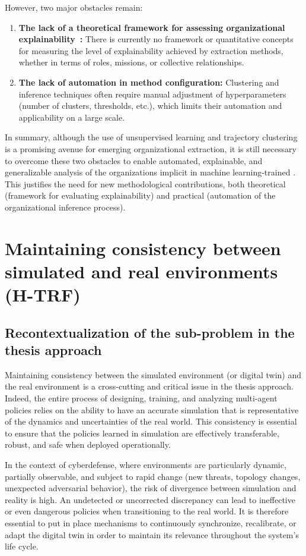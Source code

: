 However, two major obstacles remain:
\begin{enumerate}
\item \textbf{The lack of a theoretical framework for assessing organizational explainability~:} There is currently no framework or quantitative concepts for measuring the level of explainability achieved by extraction methods, whether in terms of roles, missions, or collective relationships.
\item \textbf {The lack of automation in method configuration:} Clustering and inference techniques often require manual adjustment of hyperparameters (number of clusters, thresholds, etc.), which limits their automation and applicability on a large scale.
\end {enumerate}

In summary, although the use of unsupervised learning and trajectory clustering is a promising avenue for emerging organizational extraction, it is still necessary to overcome these two obstacles to enable automated, explainable, and generalizable analysis of the organizations implicit in machine learning-trained . This justifies the need for new methodological contributions, both theoretical (framework for evaluating explainability) and practical (automation of the organizational inference process).



\section{Maintaining consistency between simulated and real environments (H-TRF)}

\subsection*{Recontextualization of the sub-problem in the thesis approach}

Maintaining consistency between the simulated environment (or digital twin) and the real environment is a cross-cutting and critical issue in the thesis approach. Indeed, the entire process of designing, training, and analyzing multi-agent policies relies on the ability to have an accurate simulation that is representative of the dynamics and uncertainties of the real world. This consistency is essential to ensure that the policies learned in simulation are effectively transferable, robust, and safe when deployed operationally.

In the context of cyberdefense, where environments are particularly dynamic, partially observable, and subject to rapid change (new threats, topology changes, unexpected adversarial behavior), the risk of divergence between simulation and reality is high. An undetected or uncorrected discrepancy can lead to ineffective or even dangerous policies when transitioning to the real world. It is therefore essential to put in place mechanisms to continuously synchronize, recalibrate, or adapt the digital twin in order to maintain its relevance throughout the system's life cycle.

